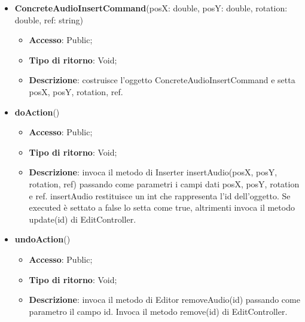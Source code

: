 {{{	
	\begin{itemize}
		\item \textbf{ConcreteAudioInsertCommand}(posX: double, posY: double, rotation: double, ref: string)
		\begin{itemize}
			\item \textbf{Accesso}: Public;
			\item \textbf{Tipo di ritorno}: Void;
			\item \textbf{Descrizione}: costruisce l’oggetto ConcreteAudioInsertCommand e setta posX, posY, rotation, ref.
		\end{itemize}
		\item \textbf{doAction}()
		\begin{itemize}
			\item \textbf{Accesso}: Public;
			\item \textbf{Tipo di ritorno}: Void;
			\item \textbf{Descrizione}: invoca il metodo di Inserter insertAudio(posX, posY, rotation, ref) passando come parametri i  campi dati posX, posY, rotation e ref. insertAudio restituisce un int che rappresenta l’id dell’oggetto. Se executed è settato a false lo setta come true, altrimenti invoca il metodo update(id) di EditController.
		\end{itemize}
		\item \textbf{undoAction}()
		\begin{itemize}
			\item \textbf{Accesso}: Public;
			\item \textbf{Tipo di ritorno}: Void;
			\item \textbf{Descrizione}: invoca il metodo di Editor removeAudio(id) passando come parametro il campo id. Invoca il metodo remove(id) di EditController.
		\end{itemize}
	\end{itemize}
	}
}}
